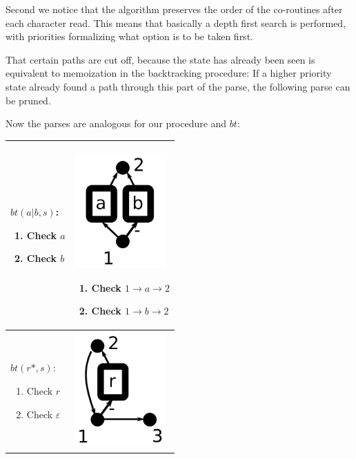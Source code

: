 \documentclass[11pt,a4paper,twoside,openright]{Thesis}
\theoremstyle{definition}
\begin{document}
Second we notice that the algorithm preserves the order of the co-routines
after each character read. This means that basically a depth first search
is performed, with priorities formalizing what option is to be taken first.

That certain paths are cut off, because the state has already been seen is
equivalent to memoization in the backtracking procedure: If a higher priority
state already found a path through this part of the parse, the following
parse can be pruned.

Now the parses are analogous for our procedure and $bt$:

\begin{center}
  \begin{tabular}{p{5cm}|p{7cm}}
    \hline \hline
    $bt(a|b, s)$:\begin{enumerate}
      \item Check $a$
      \item Check $b$
    \end{enumerate}
    &  \includegraphics[width=3.5cm]{graphs/ror}
    \begin{enumerate}
      \item Check $1\rightarrow a\rightarrow 2$
      \item Check $1\rightarrow b\rightarrow 2$
      \end{enumerate} \\ \hline
    $bt(r*, s)$:\begin{enumerate}
      \item Check $r$
      \item Check $\varepsilon$
    \end{enumerate}
    & \includegraphics[width=3.5cm]{graphs/rstar}

\end{tabular}
\end{center}
\end{document}
